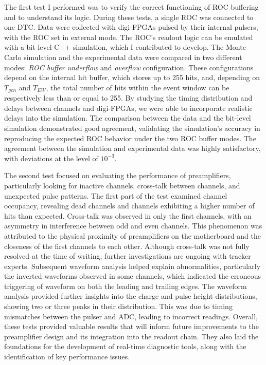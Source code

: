 The first test I performed was to verify the correct functioning of 
ROC buffering and to understand its logic. During these tests, a single 
ROC was connected to one DTC. Data were collected with digi-FPGAs pulsed 
by their internal pulsers, with the ROC set in external mode. The ROC's  
readout logic can be emulated with a bit-level C++ simulation, which I 
contributed to develop. The Monte Carlo simulation and the experimental 
data were compared in two different modes: \textit{ROC buffer underflow} and \textit{overflow} 
configuration. These configurations depend on the internal hit buffer, which stores up to 255 hits, 
and, depending on \( T_{gen} \) and \( T_{EW} \), the total number of hits within the event window can be respectively 
less than or equal to 255. 
By studying the timing distribution and delays between channels and digi-FPGAs, we 
were able to incorporate realistic delays into the simulation. The comparison 
between the data and the bit-level simulation demonstrated good agreement, 
validating the simulation's accuracy in reproducing the expected ROC behavior under 
the two ROC buffer modes. The agreement between the simulation and 
experimental data was highly satisfactory, with deviations at the level of \( 10^{-3} \).

The second test focused on evaluating the performance of preamplifiers, 
particularly looking for inactive channels, cross-talk between channels, 
and unexpected pulse patterns. The first part of the test examined channel occupancy, revealing 
dead channels and channels exhibiting a higher number of hits than expected. 
Cross-talk was observed in only the first channels, with an asymmetry in interference 
between odd and even channels. This phenomenon was attributed to the physical proximity 
of preamplifiers on the motherboard and the closeness of the first channels to each other. 
Although cross-talk was not fully resolved at the time of writing, further investigations 
are ongoing with tracker experts.
Subsequent waveform analysis helped explain abnormalities, particularly the inverted 
waveforms observed in some channels, which indicated the erroneous triggering of waveform 
on both the leading and trailing edges. The waveform analysis 
provided further insights into the charge and pulse height distributions, showing two or 
three peaks in their distribution. This was due to timing mismatches between the pulser 
and ADC, leading to incorrect readings. Overall, these tests provided valuable results 
that will inform future improvements to the preamplifier design and its integration into 
the readout chain. They also laid the foundations for the development of real-time 
diagnostic tools, along with the identification of key performance issues.

